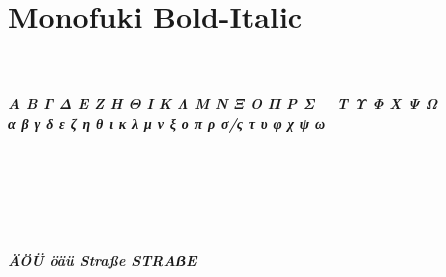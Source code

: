 \documentclass[12pt, a4paper]{article}
\begin{document}
\newpage

\section*{Monofuki Bold-Italic}

\noindent\textit{\textbf{%
\noindent\AZtext\\
\noindent\aztext\\
\noindent Α Β Γ Δ Ε Ζ Η Θ Ι Κ Λ Μ Ν Ξ Ο Π Ρ Σ~~ Τ Υ Φ Χ Ψ Ω\\
\noindent α β γ δ ε ζ η θ ι κ λ μ ν ξ ο π ρ σ/ς τ υ φ χ ψ ω\\
\noindent\digitstext\\
\noindent\punctext\\
~\\
~\\
\lipsum[0-1]
~\\
~\\
\noindent ÄÖÜ öäü Straße STRAẞE\\
}}

\newpage
\end{document}
